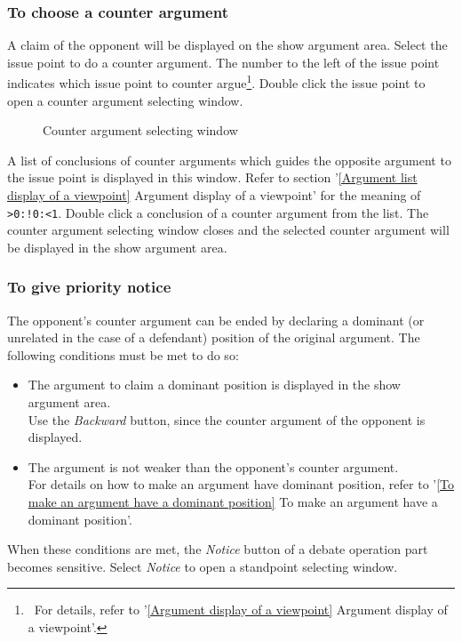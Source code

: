\subsubsection{To choose a counter argument}

A claim of the opponent will be displayed on the show argument area.
Select the issue point to do a counter argument.
The number to the left of the issue point indicates which issue point
to counter argue\footnote{\ For details, refer to '\ref{Argument display of a viewpoint} Argument display of a viewpoint'.}.
Double click the issue point to open a counter argument selecting window.

\begin{figure}[htb]
\begin{center}
\end{center}
\caption{Counter argument selecting window}\label{Counter argument selecting window}
\end{figure}

A list of conclusions of counter arguments which guides the opposite argument to the issue point is displayed in this window.
Refer to section '\ref{Argument list display of a viewpoint} Argument display of a viewpoint' for the meaning of \verb+>0:!0:<1+.
Double click a conclusion of a counter argument from the list.
The counter argument selecting window closes and the selected counter argument will be displayed in the show argument area.

\subsubsection{To give priority notice}\label{To give priority notice}

The opponent's counter argument can be ended by declaring a dominant (or unrelated in the case of a defendant) position of the original argument.
The following conditions must be met to do so:

\begin{itemize}
\item The argument to claim a dominant position is displayed in the show argument area.\\
Use the {\sl Backward} button, since the counter argument of the opponent is displayed.
\item The argument is not weaker than the opponent's counter argument.\\
For details on how to make an argument have dominant position, refer to '\ref{To make an argument have a dominant position} To make an argument have a dominant position'.
\end{itemize}
When these conditions are met, the {\sl Notice} button of a debate operation part becomes sensitive.
Select {\sl Notice} to open a standpoint selecting window.

